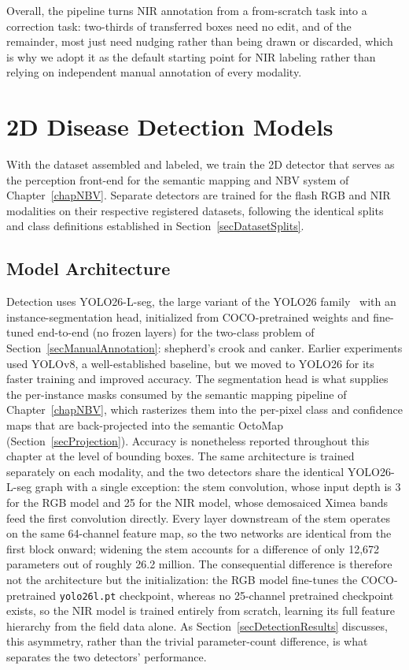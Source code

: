Overall, the pipeline turns NIR annotation from a from-scratch task
into a correction task: two-thirds of transferred boxes need no edit,
and of the remainder, most just need nudging rather than being drawn
or discarded, which is why we adopt it as the default starting point
for NIR labeling rather than relying on independent manual annotation
of every modality.

\section{2D Disease Detection Models} \label{sec2DDetection}

With the dataset assembled and labeled, we train the 2D detector that
serves as the perception front-end for the semantic mapping and NBV
system of Chapter~\ref{chapNBV}.
Separate detectors are trained for the flash RGB and NIR modalities on
their respective registered datasets, following the identical splits
and class definitions established in Section~\ref{secDatasetSplits}.

\subsection{Model Architecture} \label{secModelArch}

Detection uses YOLO26-L-seg, the large variant of the YOLO26
family~\cite{yolo26_ultralytics} with an instance-segmentation head,
initialized from COCO-pretrained weights and fine-tuned end-to-end (no
frozen layers) for the two-class problem of
Section~\ref{secManualAnnotation}: shepherd's crook and canker.
Earlier experiments used YOLOv8, a well-established baseline, but we
moved to YOLO26 for its faster training and improved accuracy.
The segmentation head is what supplies the per-instance masks consumed by
the semantic mapping pipeline of Chapter~\ref{chapNBV}, which rasterizes
them into the per-pixel class and confidence maps that are back-projected
into the semantic OctoMap (Section~\ref{secProjection}). Accuracy is 
nonetheless reported throughout this chapter at the level of bounding boxes.
The same architecture is trained separately on each modality, and the
two detectors share the identical YOLO26-L-seg graph with a single
exception: the stem convolution, whose input depth is 3 for the RGB
model and 25 for the NIR model, whose demosaiced Ximea bands feed the
first convolution directly.
Every layer downstream of the stem operates on the same 64-channel
feature map, so the two networks are identical from the first block
onward; widening the stem accounts for a difference of only 12{,}672
parameters out of roughly 26.2 million.
The consequential difference is therefore not the architecture but the
initialization: the RGB model fine-tunes the COCO-pretrained
\texttt{yolo26l.pt} checkpoint, whereas no 25-channel pretrained
checkpoint exists, so the NIR model is trained entirely from scratch,
learning its full feature hierarchy from the field data alone.
As Section~\ref{secDetectionResults} discusses, this asymmetry, rather
than the trivial parameter-count difference, is what separates the two
detectors' performance.

